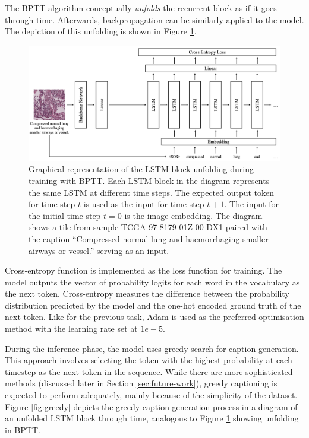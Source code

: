\documentclass{l4proj}
\begin{document}
The BPTT algorithm conceptually \emph{unfolds} the recurrent block as if it goes through time. Afterwards, backpropagation can be similarly applied to the model. The depiction of this unfolding is shown in Figure \ref{fig:bptt}.

\begin{figure}[t]
    \centering
    \includegraphics[width=1\linewidth]{images/bptt.png}
    \caption{Graphical representation of the LSTM block unfolding during training with BPTT. Each LSTM block in the diagram represents the same LSTM at different time steps. The expected output token for time step $t$ is used as the input for time step $t + 1$. The input for the initial time step $t=0$ is the image embedding. The diagram shows a tile from sample TCGA-97-8179-01Z-00-DX1 paired with the caption ``Compressed normal lung and haemorrhaging smaller airways or vessel.'' serving as an input.}
    \label{fig:bptt}
\end{figure}

Cross-entropy function is implemented as the loss function for training. The model outputs the vector of probability logits for each word in the vocabulary as the next token. Cross-entropy measures the difference between the probability distribution predicted by the model and the one-hot encoded ground truth of the next token. Like for the previous task, Adam is used as the preferred optimisation method with the learning rate set at $1e-5$. 

During the inference phase, the model uses greedy search for caption generation. This approach involves selecting the token with the highest probability at each timestep as the next token in the sequence. While there are more sophisticated methods (discussed later in Section \ref{sec:future-work}), greedy captioning is expected to perform adequately, mainly because of the simplicity of the dataset. Figure \ref{fig:greedy} depicts the greedy caption generation process in a diagram of an unfolded LSTM block through time, analogous to Figure \ref{fig:bptt} showing unfolding in BPTT.
\newpage
\end{document}

